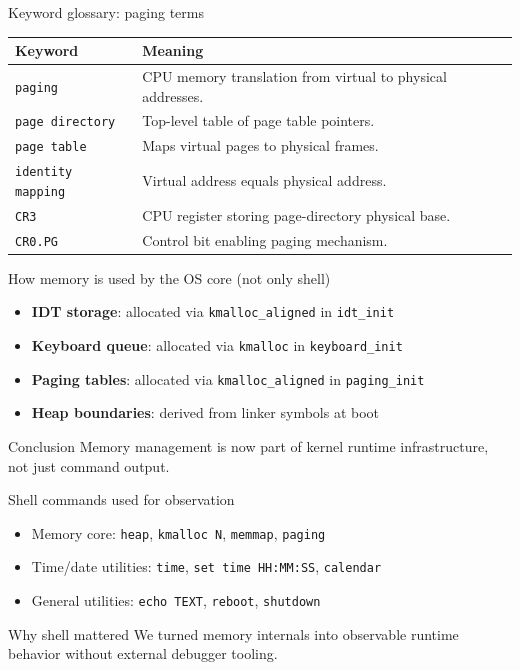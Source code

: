 \documentclass[aspectratio=169]{beamer}
\newcommand{\concept}[2]{%
  \begin{block}{#1}\smallskip #2\smallskip\end{block}\vspace{5pt}}
\begin{document}
\begin{frame}{Keyword glossary: paging terms}
  \small
  \begin{tabular}{@{}p{2.9cm}p{9.1cm}@{}}
    \toprule
    \textbf{Keyword} & \textbf{Meaning} \\
    \midrule
    \texttt{paging} & CPU memory translation from virtual to physical addresses. \\
    \texttt{page directory} & Top-level table of page table pointers. \\
    \texttt{page table} & Maps virtual pages to physical frames. \\
    \texttt{identity mapping} & Virtual address equals physical address. \\
    \texttt{CR3} & CPU register storing page-directory physical base. \\
    \texttt{CR0.PG} & Control bit enabling paging mechanism. \\
    \bottomrule
  \end{tabular}
\end{frame}

\begin{frame}{How memory is used by the OS core (not only shell)}
  \begin{itemize}
    \item \textbf{IDT storage}: allocated via \texttt{kmalloc\_aligned} in \texttt{idt\_init}
    \item \textbf{Keyboard queue}: allocated via \texttt{kmalloc} in \texttt{keyboard\_init}
    \item \textbf{Paging tables}: allocated via \texttt{kmalloc\_aligned} in \texttt{paging\_init}
    \item \textbf{Heap boundaries}: derived from linker symbols at boot
  \end{itemize}
  \concept{Conclusion}{
    Memory management is now part of kernel runtime infrastructure, not just command output.
  }
\end{frame}

\begin{frame}{Shell commands used for observation}
  \begin{itemize}
    \item Memory core: \texttt{heap}, \texttt{kmalloc N}, \texttt{memmap}, \texttt{paging}
    \item Time/date utilities: \texttt{time}, \texttt{set time HH:MM:SS}, \texttt{calendar}
    \item General utilities: \texttt{echo TEXT}, \texttt{reboot}, \texttt{shutdown}
  \end{itemize}
  \concept{Why shell mattered}{
    We turned memory internals into observable runtime behavior without external debugger tooling.
  }
\end{frame}
\end{document}
